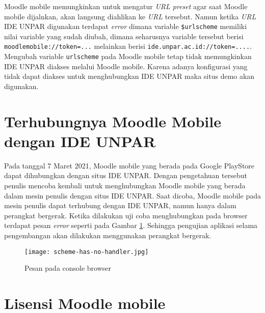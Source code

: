 Moodle mobile memungkinkan untuk mengatur \textit{URL preset} agar saat Moodle mobile dijalnkan, akan langsung diahlikan ke \textit{URL} tersebut. Namun ketika \textit{URL} IDE UNPAR digunakan terdapat \textit{error} dimana variable \texttt{\$urlscheme} memiliki nilai variable yang sudah diubah, dimana seharusnya variable tersebut berisi \texttt{moodlemobile://token=...} melainkan berisi \texttt{ide.unpar.ac.id://token=....}. Mengubah variable \texttt{urlscheme} pada Moodle mobile tetap tidak memungkinkan  IDE UNPAR diakses melalui Moodle mobile. Karena  adanya konfigurasi yang tidak dapat diakses untuk menghubungkan IDE UNPAR maka situs demo akan digunakan.

\section{Terhubungnya Moodle Mobile dengan IDE UNPAR}
\label{mobile:to:ide}

Pada tanggal 7 Maret 2021, Moodle mobile yang berada pada Google PlayStore dapat dihubungkan dengan situs IDE UNPAR. Dengan pengetahuan tersebut penulis mencoba kembali untuk menghubungkan Moodle mobile yang berada dalam mesin penulis dengan situs IDE UNPAR. Saat dicoba, Moodle mobile pada mesin penulis dapat terhubung dengan IDE UNPAR, namun hanya dalam perangkat bergerak. Ketika dilakukan uji coba menghubungkan pada browser terdapat pesan \textit{error} seperti pada Gambar \ref{fig:protocolerror}. Sehingga pengujian aplikasi selama pengembangan akan dilakukan menggunakan perangkat bergerak.

\begin{figure}[H] 
	\centering  
	\texttt{[image: scheme-has-no-handler.jpg]}  
	\caption[Pesan pada Console browser] {Pesan pada console browser} 
	\label{fig:protocolerror} 
\end{figure} 

\section{Lisensi Moodle mobile}


